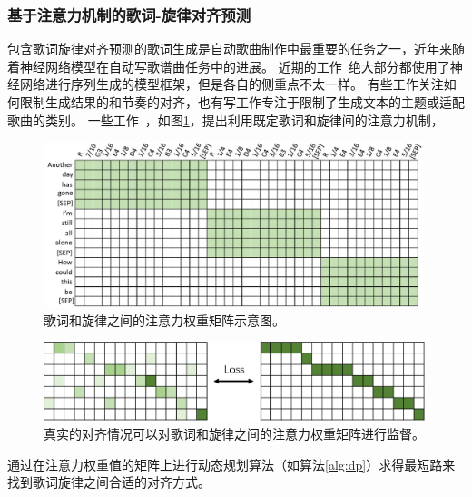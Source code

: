 \subsubsection{基于注意力机制的歌词-旋律对齐预测}
包含歌词旋律对齐预测的歌词生成是自动歌曲制作中最重要的任务之一，近年来随着神经网络模型在自动写歌谱曲任务中的进展。
近期的工作~\citep{lee-etal-2019-icomposer,Chen2020MelodyConditionedLG,songmass,telemelody,ai_lyricist,xue-etal-2021-deeprapper}绝大部分都使用了神经网络进行序列生成的模型框架，但是各自的侧重点不太一样。
有些工作关注如何限制生成结果的和节奏的对齐，也有写工作专注于限制了生成文本的主题或适配歌曲的类别。
一些工作~\citep{songmass,telemelody}，如图\ref{fig:attn_diag}，提出利用既定歌词和旋律间的注意力机制，
\begin{figure}[ht]
  \includegraphics[width=0.99\textwidth]{figure/related/digattn.pdf}
  \caption{歌词和旋律之间的注意力权重矩阵示意图。}
  \label{fig:attn_diag}
\end{figure}
\begin{figure}[ht]
  \includegraphics[width=0.99\textwidth]{figure/related/GuidedAttention.png}
  \caption{真实的对齐情况可以对歌词和旋律之间的注意力权重矩阵进行监督。}
  \label{fig:attn_loss}
\end{figure}
通过在注意力权重值的矩阵上进行动态规划算法（如算法\ref{alg:dp}）求得最短路来找到歌词旋律之间合适的对齐方式。
